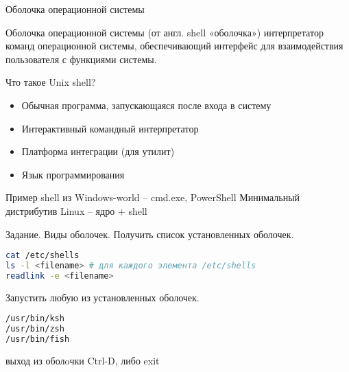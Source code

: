 \begin{frame}[fragile]{Оболочка операционной системы}

     \begin{block}{Оболочка операционной системы}
     (от англ. shell «оболочка») \alert{интерпретатор команд} операционной системы, обеспечивающий интерфейс для взаимодействия пользователя с функциями системы.  
     \end{block}
     Что такое Unix shell?
     \begin{itemize}
        \item Обычная программа, запускающаяся после входа в систему
        \item Интерактивный командный интерпретатор
        \item Платформа интеграции (для утилит)
        \item Язык программирования
     \end{itemize}

	\pause
	\vspace{0.5in}
	Пример shell из  Windows-world --  cmd.exe, PowerShell
	\vspace{0.5in}
	Минимальный дистрибутив Linux -- ядро + shell 

\end{frame}

\begin{frame}[fragile]{Задание. Виды оболочек.}
Получить список установленных оболочек.
\begin{lstlisting}[language=bash]
cat /etc/shells
ls -l <filename> # для каждого элемента /etc/shells
readlink -e <filename> 
\end{lstlisting}
Запустить любую из установленных оболочек. 

\begin{lstlisting}[language=bash]
/usr/bin/ksh 
/usr/bin/zsh 
/usr/bin/fish
\end{lstlisting}

выход из оболoчки  Ctrl-D, либо exit
\end{frame}


